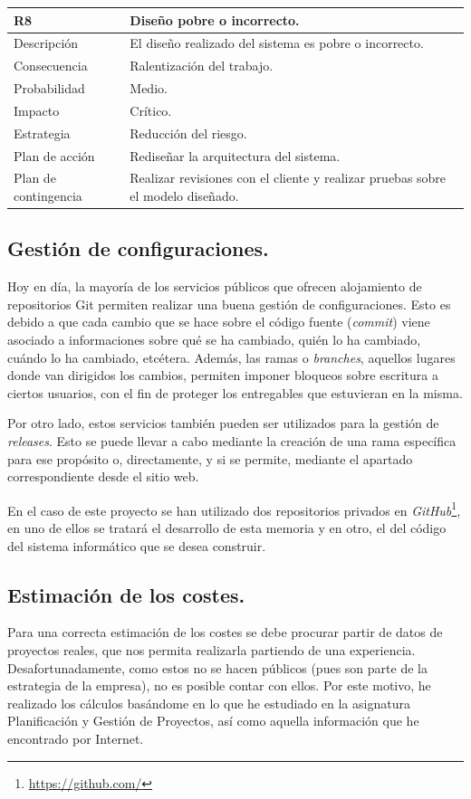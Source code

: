 \documentclass[twoside]{report}
\newcommand\addrow[2]{#1 &#2\\ }
\newcommand\addheading[2]{#1 &#2\\ \hline}
\newcommand\tabularhead{\begin{tabular}{lp{0.7\textwidth}}
\hline
}
\newenvironment{risk}{\tabularhead}
{\hline\end{tabular}}
\begin{document}
\begin{risk}
  \addheading{R8}{Diseño pobre o incorrecto.} 
  \addrow{Descripción}{El diseño realizado del sistema es pobre o incorrecto.}
  \addrow{Consecuencia}{Ralentización del trabajo.}
  \addrow{Probabilidad}{Medio.}
  \addrow{Impacto}{Crítico. }
  \addrow{Estrategia}{Reducción del riesgo.}
  \addrow{Plan de acción}{Rediseñar la arquitectura del sistema.}
  \addrow{Plan de contingencia}{Realizar revisiones con el cliente y realizar pruebas sobre el modelo diseñado.}
\end{risk}

\subsection{Gestión de configuraciones.}

Hoy en día, la mayoría de los servicios públicos que ofrecen alojamiento de repositorios Git permiten realizar una buena gestión de configuraciones. Esto es debido a que cada cambio que se hace sobre el código fuente (\textit{commit}) viene asociado a informaciones sobre qué se ha cambiado, quién lo ha cambiado, cuándo lo ha cambiado, etcétera. Además, las ramas o \textit{branches}, aquellos lugares donde van dirigidos los cambios, permiten imponer bloqueos sobre escritura a ciertos usuarios, con el fin de proteger los entregables que estuvieran en la misma.

Por otro lado, estos servicios también pueden ser utilizados para la gestión de \textit{releases}. Esto se puede llevar a cabo mediante la creación de una rama específica para ese propósito o, directamente, y si se permite, mediante el apartado correspondiente desde el sitio web.

En el caso de este proyecto se han utilizado dos repositorios privados en \textit{GitHub}\footnote{\url{https://github.com/}}, en uno de ellos se tratará el desarrollo de esta memoria y en otro, el del código del sistema informático que se desea construir.

\subsection{Estimación de los costes.}

Para una correcta estimación de los costes se debe procurar partir de datos de proyectos reales, que nos permita realizarla partiendo de una experiencia. Desafortunadamente, como estos no se hacen públicos (pues son parte de la estrategia de la empresa), no es posible contar con ellos. Por este motivo, he realizado los cálculos basándome en lo que he estudiado en la asignatura \cite{pgptema2} Planificación y Gestión de Proyectos, así como aquella información que he encontrado por Internet.
\end{document}
